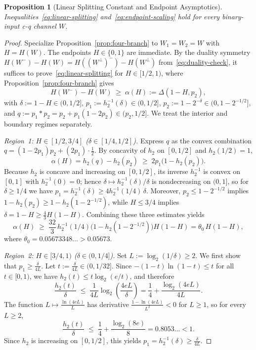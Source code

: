 \documentclass[10pt,a4paper]{article}
\numberwithin{equation}{section}
\theoremstyle{plain}
\newtheorem{proposition}[theorem]{Proposition}
\theoremstyle{definition}
\theoremstyle{remark}
\begin{document}
\begin{proposition}[Linear Splitting Constant and Endpoint Asymptotics]\label{prop:linear-splitting}
Inequalities~\eqref{eq:linear-splitting} and~\eqref{eq:endpoint-scaling} hold for every binary-input c-q channel $W$.
\end{proposition}

\begin{proof}
Specialize Proposition~\ref{prop:four-branch} to $W_1 = W_2 = W$ with $H = H(W)$. The endpoints $H \in \{0,1\}$ are immediate. By the duality symmetry $H(W^-) - H(W) = H((W^{\perp})^-) - H(W^{\perp})$ from~\eqref{eq:duality-check}, it suffices to prove~\eqref{eq:linear-splitting} for $H \in [1/2, 1)$, where Proposition~\ref{prop:four-branch} gives
\[
H(W^-) - H(W) \;\ge\; \alpha(H) := \Delta(1 - H, p_2),
\]
with $\delta := 1 - H \in (0, 1/2]$, $p_1 := h_2^{-1}(\delta) \in (0, 1/2]$, $p_2 := 1 - 2^{-\delta} \in (0, 1 - 2^{-1/2}]$, and $q := p_1 * p_2 = p_2 + p_1(1 - 2p_2) \in (p_2, 1/2]$. We treat the interior and boundary regimes separately.

\emph{Region~1: $H \in [1/2, 3/4]$ ($\delta \in [1/4, 1/2]$).} Express $q$ as the convex combination $q = (1 - 2p_1)p_2 + (2p_1)\cdot \frac{1}{2}$. By concavity of $h_2$ on $[0, 1/2]$ and $h_2(1/2) = 1$,
\[
\alpha(H) = h_2(q) - h_2(p_2) \;\ge\; 2p_1\bigl(1 - h_2(p_2)\bigr).
\]
Because $h_2$ is concave and increasing on $[0, 1/2]$, its inverse $h_2^{-1}$ is convex on $[0,1]$ with $h_2^{-1}(0) = 0$; hence $\delta \mapsto h_2^{-1}(\delta)/\delta$ is nondecreasing on $(0,1]$, so for $\delta \ge 1/4$ we have $p_1 = h_2^{-1}(\delta) \ge 4h_2^{-1}(1/4)\,\delta$. Moreover, $p_2 \le 1 - 2^{-1/2}$ implies $1 - h_2(p_2) \ge 1 - h_2(1 - 2^{-1/2})$, while $H \le 3/4$ implies $\delta = 1 - H \ge \frac{4}{3} H(1 - H)$. Combining these three estimates yields
\[
\alpha(H) \;\ge\; \frac{32}{3}\, h_2^{-1}(1/4)\bigl(1 - h_2(1 - 2^{-1/2})\bigr) H(1 - H) = \theta_0\, H(1 - H),
\]
where $\theta_0 = 0.05673348\ldots > 0.05673$.

\emph{Region~2: $H \in [3/4, 1)$ ($\delta \in (0, 1/4]$).} Set $L := \log_2(1/\delta) \ge 2$. We first show that $p_1 \ge \frac{\delta}{4L}$. Let $t := \frac{\delta}{4L} \in (0, 1/32]$. Since $-(1 - t)\ln(1 - t) \le t$ for all $t \in [0, 1)$, we have $h_2(t) \le t\log_2(e/t)$, and therefore
\[
\frac{h_2(t)}{\delta} \;\le\; \frac{1}{4L}\log_2\!\left(\frac{4eL}{\delta}\right) = \frac{1}{4} + \frac{\log_2(4eL)}{4L}.
\]
The function $L \mapsto \frac{\ln(4eL)}{L}$ has derivative $\frac{1 - \ln(4eL)}{L^2} < 0$ for $L \ge 1$, so for every $L \ge 2$,
\[
\frac{h_2(t)}{\delta} \;\le\; \frac{1}{4} + \frac{\log_2(8e)}{8} = 0.8053\ldots < 1.
\]
Since $h_2$ is increasing on $[0, 1/2]$, this yields $p_1 = h_2^{-1}(\delta) \ge \frac{\delta}{4L}$.


\end{proof}
\end{document}
